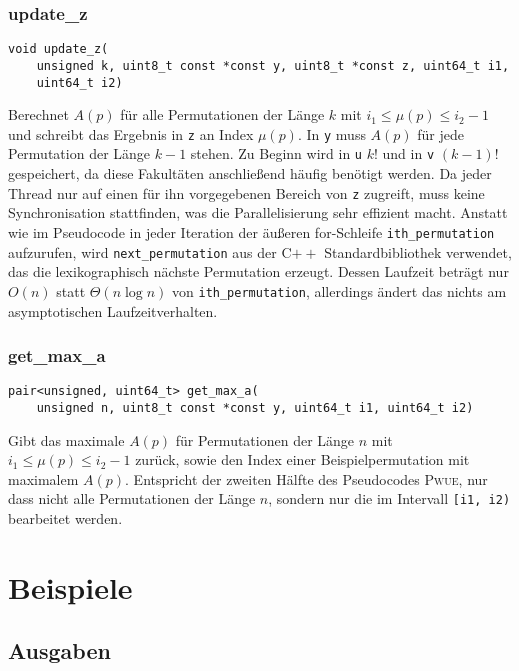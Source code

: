 \documentclass[a4paper, 10pt, ngerman]{article}
\begin{document}
\subsubsection{update\_z}
\verb|void update_z(| \\
\verb|    unsigned k, uint8_t const *const y, uint8_t *const z, uint64_t i1,| \\
\verb|    uint64_t i2)|
\medskip

\noindent Berechnet $A(p)$ für alle Permutationen der Länge $k$ mit $i_1 \le \mu(p) \le i_2 - 1$ und schreibt das Ergebnis in \verb|z| an Index $\mu(p)$. In \verb|y| muss $A(p)$ für jede Permutation der Länge $k-1$ stehen. Zu Beginn wird in \verb|u| $k!$ und in \verb|v| $(k - 1)!$ gespeichert, da diese Fakultäten anschließend häufig benötigt werden. Da jeder Thread nur auf einen für ihn vorgegebenen Bereich von \verb|z| zugreift, muss keine Synchronisation stattfinden, was die Parallelisierung sehr effizient macht. Anstatt wie im Pseudocode in jeder Iteration der äußeren for-Schleife \verb|ith_permutation| aufzurufen, wird \verb|next_permutation| aus der C$++$ Standardbibliothek verwendet, das die lexikographisch nächste Permutation erzeugt. Dessen Laufzeit beträgt nur $O(n)$ statt $\Theta(n \log n)$ von \verb|ith_permutation|, allerdings ändert das nichts am asymptotischen Laufzeitverhalten.

\subsubsection{get\_max\_a}
\verb|pair<unsigned, uint64_t> get_max_a(| \\
\verb|    unsigned n, uint8_t const *const y, uint64_t i1, uint64_t i2)|
\medskip

\noindent Gibt das maximale $A(p)$ für Permutationen der Länge $n$ mit $i_1 \le \mu(p) \le i_2 - 1$ zurück, sowie den Index einer Beispielpermutation mit maximalem $A(p)$. Entspricht der zweiten Hälfte des Pseudocodes \textsc{Pwue}, nur dass nicht alle Permutationen der Länge $n$, sondern nur die im Intervall \verb|[i1, i2)| bearbeitet werden.

\section{Beispiele}

\subsection{Ausgaben}
\end{document}

